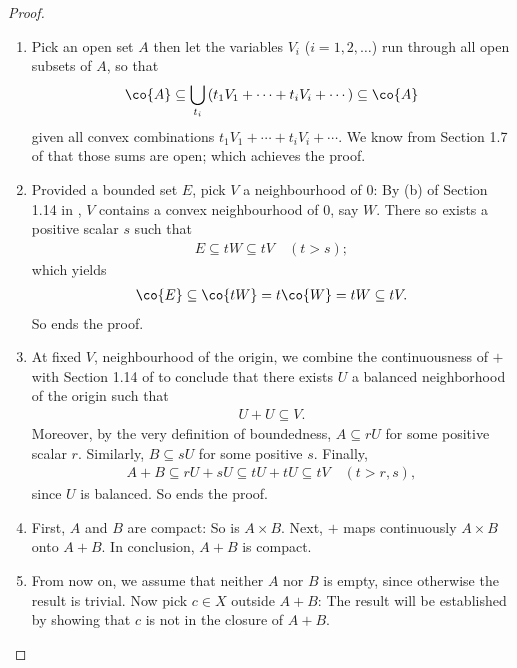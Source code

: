 \begin{proof}
\renewcommand{\labelenumi}{(\alph{enumi})} 
\begin{enumerate}
\item%
Pick an open set $A$ then let the variables $\mathit{V}_i$ %
($i=1, 2, \dots$) run through all open subsets of $A$, so that %
%
\begin{align}
  \co{A} \subseteq 
  \bigcup_{t_i} \, %
    (t_1V_1 + \cdots + t_i V_i  + \cdots) 
  \subseteq \co{A}
\end{align}
%
given all convex combinations %
%
  $t_1V_1 + \cdots + t_i V_i  + \cdots $. %
We know from Section 1.7 of \cite{FA} that those sums are open; %
which achieves the proof. %
%
\item Provided a bounded set $E$, %
pick $V$ a neighbourhood of $0$: By (b) of Section 1.14 in \cite{FA}, %
$V$ contains a convex neighbourhood of $0$, say $W$. %
%
There so exists a positive scalar $s$ such that
%
\begin{align}
  E \subseteq tW \subseteq tV \quad (t>s); 
\end{align}
%
which yields %
%
\begin{align}
  \co{E} \subseteq \co{tW} = t\co{W} = t W \subseteq tV.
\end{align}
%
So ends the proof. %
%
\item At fixed $V$, neighbourhood of the origin, %
we combine the continuousness of $+$ with Section 1.14 of \cite{FA} %
to conclude that there exists $U$ a balanced neighborhood of the origin %
such that %
%
\begin{align}
  U+U\subseteq V. 
\end{align}
%
Moreover, by the very definition of boundedness, %
$A \subseteq r U$ for some positive scalar $r$. %
Similarly, $B \subseteq s U$ for some positive $s$. %
%
Finally, 
%
\begin{align}
A+B \subseteq  rU + sU \subseteq tU + tU \subseteq tV \quad (t > r, s), 
\end{align}
%
since $U$ is balanced. So ends the proof. %
%
\item First, $A$ and $B$ are compact: So is $A\times B$. %
Next, $+$ maps continuously $A\times B$ onto $A+B$. %
In conclusion, $A+B$ is compact. %
%
\item From now on, we assume that neither $A$ nor $B$ is empty, %
since otherwise the result is trivial.  %
Now pick $c\in X$ outside $A+B$: %
The result will be established by showing that $c$ is not in the closure %
of $A+B$. \\

\end{enumerate}
\end{proof}
